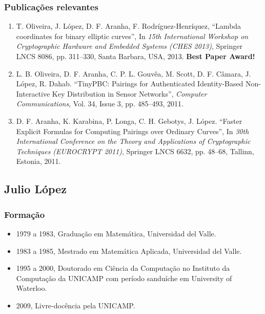 \documentclass[12pt]{article}
\begin{document}
\subsubsection*{Publicações relevantes}

\begin{enumerate}\setlength\itemsep{1pt}
    \item T. Oliveira, J. López, {D. F. Aranha}, F. Rodr\'iguez-Henr\'iquez, ``Lambda coordinates for binary elliptic curves'',
    In \textsl{15th International Workshop on Cryptographic Hardware and Embedded Systems (CHES 2013)}, Springer LNCS 8086, pp. 311--330, Santa Barbara, USA, 2013. \textbf{Best Paper Award!}

    \item L. B. Oliveira, {D. F. Aranha}, C. P. L. Gouvêa, M. Scott, D. F. Câmara, J. López, R. Dahab.
    ``TinyPBC: Pairings for Authenticated Identity-Based Non-Interactive Key Distribution in Sensor Networks'', 
    \textsl{Computer Communications}, Vol. 34, Issue 3, pp. 485--493, 2011.

    \item {D. F. Aranha}, K. Karabina, P. Longa, C. H. Gebotys, J. López.
    ``Faster Explicit Formulas for Computing Pairings over Ordinary Curves'',
    In \textsl{30th International Conference on the Theory and Applications of Cryptographic Techniques (EUROCRYPT 2011)}, Springer LNCS 6632, pp. 48--68, Tallinn, Estonia, 2011.
\end{enumerate}

\subsection{Julio L\'opez}

\subsubsection*{Formação}
\begin{itemize}\setlength\itemsep{1pt}
\item 1979 a 1983, Graduação em Matemática, Universidad del Valle.
\item 1983 a 1985, Mestrado  em Matemática Aplicada, Universidad del Valle.
\item 1995 a 2000, Doutorado em Ciência da Computação no Instituto da Computação da UNICAMP com período sanduíche em University of Waterloo.
\item 2009, Livre-docência pela UNICAMP.
\end{itemize}
\end{document}
